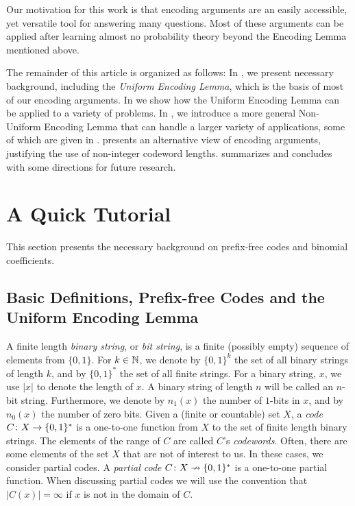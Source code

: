 \documentclass[prodmode,acmcsur]{acmsmall}
\begin{document}
Our motivation for this work is that encoding arguments are an easily
accessible, yet versatile tool for answering many questions.  Most of
these arguments can be applied after learning almost no probability
theory beyond the Encoding Lemma mentioned above.

The remainder of this article is organized as follows: In
, we present necessary background, including the
\emph{Uniform Encoding Lemma}, which is the basis of most of our
encoding arguments. In  we show how the Uniform
Encoding Lemma can be applied to a variety of problems. In
, we introduce a more general Non-Uniform Encoding Lemma
that can handle a larger variety of applications, some of which are
given in .   presents an
alternative view of encoding arguments, justifying the use of
non-integer codeword lengths.   summarizes and
concludes with some directions for future research.

\section{A Quick Tutorial}

This section presents the necessary background on prefix-free codes
and binomial coefficients.

\subsection{Basic Definitions, Prefix-free Codes and the Uniform 
Encoding Lemma}

A finite length \emph{binary string}, or \emph{bit string}, is a
finite (possibly empty) sequence of elements from $\{0, 1\}$. For
$k \in \mathbb{N}$, we denote by $\{0, 1\}^k$ the set of all binary strings of
length $k$, and by $\{0,1\}^*$ the set of all finite strings.
For a binary string, $x$, we use $|x|$ to denote the length of $x$.  A
binary string of length $n$ will be called an $n$-bit string. 
Furthermore, we denote by $n_1(x)$ the number of $1$-bits in
$x$, and by $n_0(x)$ the number of zero bits.
Given a (finite or countable) set $X$, a
\emph{code} $C\colon X\to \{0,1\}^*$ is a one-to-one function from 
$X$ to the set of finite length binary strings.  The elements of
the range of $C$ are called $C$'s
\emph{codewords}. Often, there are some
elements of the set $X$ that are not of interest to us.  In these
cases, we consider partial codes. A \emph{partial code}
$C\colon X\nrightarrow \{0,1\}^*$ is a one-to-one partial function.
When discussing partial codes we will use the convention that
$|C(x)|=\infty$ if $x$ is not in the domain of $C$.
\end{document}

